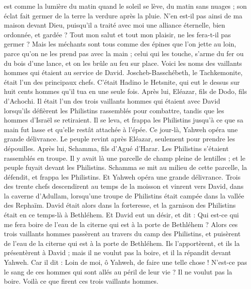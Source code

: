 \begin{multicols}{2}
est comme la lumière du matin quand le soleil se lève, du matin sans nuages ; son éclat fait germer de la terre la verdure après la pluie.
N’en est-il pas ainsi de ma maison devant Dieu, puisqu'il a traité avec moi une alliance éternelle, bien ordonnée, et gardée ? Tout mon salut et tout mon plaisir, ne les fera-t-il pas germer ?
Mais les méchants sont tous comme des épines que l’on jette au loin, parce qu'on ne les prend pas avec la main ;
celui qui les touche, s’arme du fer ou du bois d'une lance, et on les brûle au feu sur place.
Voici les noms des vaillants hommes qui étaient au service de David. Joscheb-Basschébeth, le Tachkemonite, était l’un des principaux chefs. C’était Hadino le Hetsnite, qui eut le dessus sur huit cents hommes qu'il tua en une seule fois.
Après lui, Eléazar, fils de Dodo, fils d'Achochi. Il était l'un des trois vaillants hommes qui étaient avec David lorsqu'ils défièrent les Philistins rassemblés pour combattre, tandis que les hommes d'Israël se retiraient.
Il se leva, et frappa les Philistins jusqu'à ce que sa main fut lasse et qu'elle restât attachée à l'épée. Ce jour-là, Yahweh opéra une grande délivrance. Le peuple revint après Eléazar, seulement pour prendre les dépouilles.
Après lui, Schamma, fils d'Agué d'Harar. Les Philistins s'étaient rassemblés en troupe. Il y avait là une parcelle de champ pleine de lentilles ; et le peuple fuyait devant les Philistins.
Schamma se mit au milieu de cette parcelle, la défendit, et frappa les Philistins. Et Yahweh opéra une grande délivrance.
Trois des trente chefs descendirent au temps de la moisson et vinrent vers David, dans la caverne d'Adullam, lorsqu'une troupe de Philistins était campée dans la vallée des Rephaïm.
David était alors dans la forteresse, et la garnison des Philistins était en ce temps-là à Bethléhem.
Et David eut un désir, et dit : Qui est-ce qui me fera boire de l'eau de la citerne qui est à la porte de Bethléhem ?
Alors ces trois vaillants hommes passèrent au travers du camp des Philistins, et puisèrent de l'eau de la citerne qui est à la porte de Bethléhem. Ils l’apportèrent, et ils la présentèrent à David ; mais il ne voulut pas la boire, et il la répandit devant Yahweh.
Car il dit : Loin de moi, ô Yahweh, de faire une telle chose ! N'est-ce pas le sang de ces hommes qui sont allés au péril de leur vie ? Il ne voulut pas la boire. Voilà ce que firent ces trois vaillants hommes.

\end{multicols}

